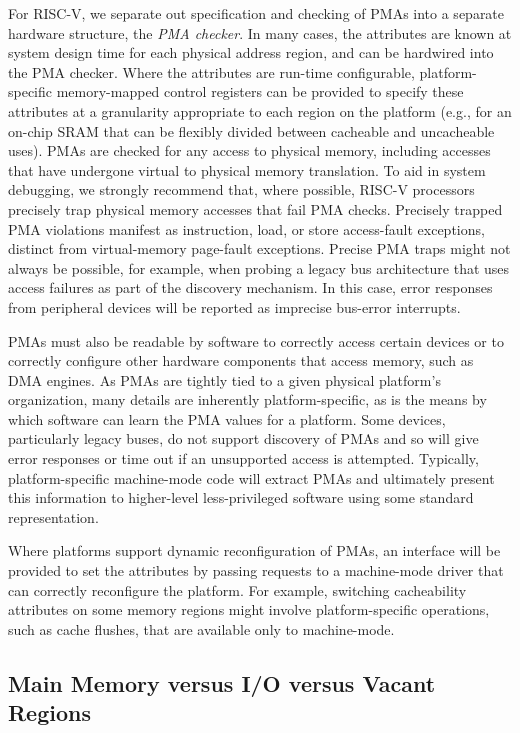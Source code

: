 For RISC-V, we separate out specification and checking of PMAs into a
separate hardware structure, the {\em PMA checker}.  In many cases,
the attributes are known at system design time for each physical
address region, and can be hardwired into the PMA checker.  Where the
attributes are run-time configurable, platform-specific memory-mapped
control registers can be provided to specify these attributes at a
granularity appropriate to each region on the platform (e.g., for an
on-chip SRAM that can be flexibly divided between cacheable and
uncacheable uses).  PMAs are checked for any access to physical
memory, including accesses that have undergone virtual to physical
memory translation.  To aid in system debugging, we strongly recommend
that, where possible, RISC-V processors precisely trap physical memory
accesses that fail PMA checks.  Precisely trapped PMA violations manifest
as instruction, load, or store access-fault exceptions, distinct from
virtual-memory page-fault exceptions. Precise PMA traps might not always be
possible, for example, when probing a legacy bus architecture that
uses access failures as part of the discovery mechanism.  In this
case, error responses from peripheral devices will be reported as imprecise
bus-error interrupts.

PMAs must also be readable by software to correctly access certain
devices or to correctly configure other hardware components that
access memory, such as DMA engines.  As PMAs are tightly tied to a
given physical platform's organization, many details are inherently
platform-specific, as is the means by which software can learn the PMA
values for a platform.  Some
devices, particularly legacy buses, do not support discovery of PMAs
and so will give error responses or time out if an unsupported access
is attempted.  Typically, platform-specific machine-mode code will
extract PMAs and ultimately present this information to higher-level
less-privileged software using some standard representation.

Where platforms support dynamic reconfiguration of PMAs, an interface
will be provided to set the attributes by passing requests to a
machine-mode driver that can correctly reconfigure the platform.  For
example, switching cacheability attributes on some memory regions
might involve platform-specific operations, such as cache flushes,
that are available only to machine-mode.

\subsection{Main Memory versus I/O versus Vacant Regions}

